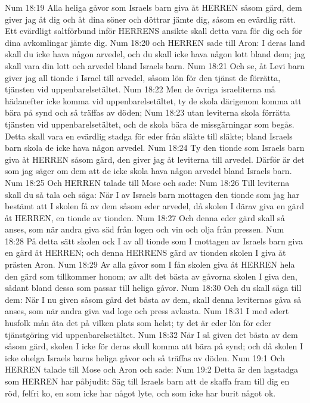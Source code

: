 Num 18:19  Alla heliga gåvor som Israels barn giva åt HERREN såsom gärd, dem giver jag åt dig och åt dina söner och döttrar jämte dig, såsom en evärdlig rätt. Ett evärdligt saltförbund inför HERRENS ansikte skall detta vara för dig och för dina avkomlingar jämte dig.
Num 18:20  och HERREN sade till Aron: I deras land skall du icke hava någon arvedel, och du skall icke hava någon lott bland dem; jag skall vara din lott och arvedel bland Israels barn.
Num 18:21  Och se, åt Levi barn giver jag all tionde i Israel till arvedel, såsom lön för den tjänst de förrätta, tjänsten vid uppenbarelsetältet.
Num 18:22  Men de övriga israeliterna må hädanefter icke komma vid uppenbarelsetältet, ty de skola därigenom komma att bära på synd och så träffas av döden;
Num 18:23  utan leviterna skola förrätta tjänsten vid uppenbarelsetältet, och de skola bära de missgärningar som begås. Detta skall vara en evärdlig stadga för eder från släkte till släkte; bland Israels barn skola de icke hava någon arvedel.
Num 18:24  Ty den tionde som Israels barn giva åt HERREN såsom gärd, den giver jag åt leviterna till arvedel. Därför är det som jag säger om dem att de icke skola hava någon arvedel bland Israels barn.
Num 18:25  Och HERREN talade till Mose och sade:
Num 18:26  Till leviterna skall du så tala och säga: När I av Israels barn mottagen den tionde som jag har bestämt att I skolen få av dem såsom eder arvedel, då skolen I därav giva en gärd åt HERREN, en tionde av tionden.
Num 18:27  Och denna eder gärd skall så anses, som när andra giva säd från logen och vin och olja från pressen.
Num 18:28  På detta sätt skolen ock I av all tionde som I mottagen av Israels barn giva en gärd åt HERREN; och denna HERRENS gärd av tionden skolen I giva åt prästen Aron.
Num 18:29  Av alla gåvor som I fån skolen giva åt HERREN hela den gärd som tillkommer honom; av allt det bästa av gåvorna skolen I giva den, sådant bland dessa som passar till heliga gåvor.
Num 18:30  Och du skall säga till dem: När I nu given såsom gärd det bästa av dem, skall denna leviternas gåva så anses, som när andra giva vad loge och press avkasta.
Num 18:31  I med edert husfolk mån äta det på vilken plats som helst; ty det är eder lön för eder tjänstgöring vid uppenbarelsetältet.
Num 18:32  När I så given det bästa av dem såsom gärd, skolen I icke för deras skull komma att bära på synd; och då skolen I icke ohelga Israels barns heliga gåvor och så träffas av döden.
Num 19:1  Och HERREN talade till Mose och Aron och sade:
Num 19:2  Detta är den lagstadga som HERREN har påbjudit: Säg till Israels barn att de skaffa fram till dig en röd, felfri ko, en som icke har något lyte, och som icke har burit något ok.
